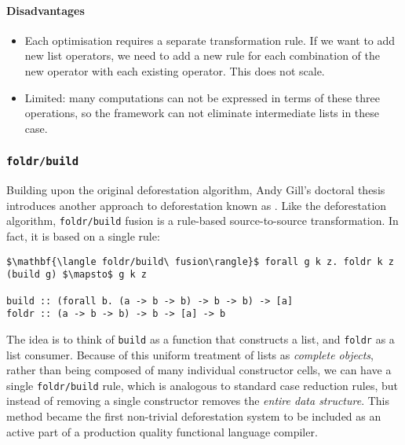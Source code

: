 \paragraph{Disadvantages}
\begin{itemize}
    \item Each optimisation requires a separate transformation rule. If we want
        to add new list operators, we need to add a new rule for each
        combination of the new operator with each existing operator. This does
        not scale.

    \item Limited: many computations can not be expressed in terms of these
        three operations, so the framework can not eliminate intermediate lists
        in these case. 
\end{itemize}


\subsubsection{\texttt{foldr/build}}

Building upon the original deforestation algorithm, Andy
Gill's doctoral thesis introduces another approach to deforestation known as
 \cite{Gill:1996tf,Gill:1993}.
Like the deforestation algorithm, \texttt{foldr/build} fusion is a rule-based
source-to-source transformation. In fact, it is based on a single rule:
%
\begin{lstlisting}[style=Haskell,numbers=none,mathescape,caption={The \texttt{foldr/build} transformation}]
$\mathbf{\langle foldr/build\ fusion\rangle}$ forall g k z. foldr k z (build g) $\mapsto$ g k z

build :: (forall b. (a -> b -> b) -> b -> b) -> [a]
foldr :: (a -> b -> b) -> b -> [a] -> b
\end{lstlisting}

The idea is to think of \texttt{build} as a function that constructs a list, and
\texttt{foldr} as a list consumer. Because of this uniform treatment of lists as
\emph{complete objects}, rather than being composed of many individual
constructor cells, we can have a single \texttt{foldr/build} rule, which is
analogous to standard case reduction rules, but instead of removing a single
constructor removes the \emph{entire data structure}. This method became the
first non-trivial deforestation system to be included as an active part of a
production quality functional language compiler.

